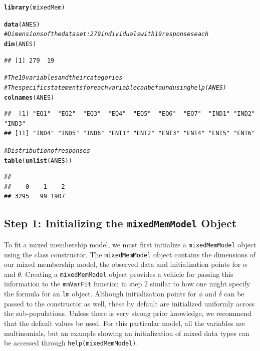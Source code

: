 \documentclass{article}\usepackage[]{graphicx}\usepackage[]{color}
\makeatletter
\newcommand{\hlcom}[1]{\textcolor[rgb]{0.678,0.584,0.686}{\textit{#1}}}%
\newcommand{\hlstd}[1]{\textcolor[rgb]{0.345,0.345,0.345}{#1}}%
\newcommand{\hlkwd}[1]{\textcolor[rgb]{0.737,0.353,0.396}{\textbf{#1}}}%
\newenvironment{kframe}{%
 \def\at@end@of@kframe{}%
 \ifinner\ifhmode%
  \def\at@end@of@kframe{\end{minipage}}%
  \begin{minipage}{\columnwidth}%
 \fi\fi%
 \def\FrameCommand##1{\hskip\@totalleftmargin \hskip-\fboxsep
 \colorbox{shadecolor}{##1}\hskip-\fboxsep
     \hskip-\linewidth \hskip-\@totalleftmargin \hskip\columnwidth}%
 \MakeFramed {\advance\hsize-\width
   \@totalleftmargin\z@ \linewidth\hsize
   \@setminipage}}%
 {\par\unskip\endMakeFramed%
 \at@end@of@kframe}
\newenvironment{knitrout}{}{} %
\renewenvironment{knitrout}{\begin{singlespace}}{\end{singlespace}}
\makeatother
\begin{document}
\begin{knitrout}
\color{fgcolor}\begin{kframe}
\begin{alltt}
\hlkwd{library}\hlstd{(mixedMem)}
\end{alltt}


{\ttfamily\noindent\itshape\color{messagecolor}{\#\# Loading required package: gtools}}\begin{alltt}
\hlkwd{data}\hlstd{(ANES)}
\hlcom{# Dimensions of the data set: 279 individuals with 19 responses each}
\hlkwd{dim}\hlstd{(ANES)}
\end{alltt}
\begin{verbatim}
## [1] 279  19
\end{verbatim}
\begin{alltt}
\hlcom{# The 19 variables and their categories}
\hlcom{#The specific statements for each variable can be found using help(ANES)}
\hlkwd{colnames}\hlstd{(ANES)}
\end{alltt}
\begin{verbatim}
##  [1] "EQ1"  "EQ2"  "EQ3"  "EQ4"  "EQ5"  "EQ6"  "EQ7"  "IND1" "IND2" "IND3"
## [11] "IND4" "IND5" "IND6" "ENT1" "ENT2" "ENT3" "ENT4" "ENT5" "ENT6"
\end{verbatim}
\begin{alltt}
\hlcom{# Distribution of responses}
\hlkwd{table}\hlstd{(}\hlkwd{unlist}\hlstd{(ANES))}
\end{alltt}
\begin{verbatim}
## 
##    0    1    2 
## 3295   99 1907
\end{verbatim}
\end{kframe}
\end{knitrout}

\subsection*{Step 1: Initializing the \texttt{mixedMemModel} Object}
To fit a mixed membership model, we must first initialize a \texttt{mixedMemModel} object using the class constructor. The \texttt{mixedMemModel} object contains the dimensions of our mixed membership model, the observed data and initialization points for $\alpha$ and $\theta$. Creating a \texttt{mixedMemModel} object provides a vehicle for passing this information to the \texttt{mmVarFit} function in step 2 similar to how one might specify the formula for an \texttt{lm} object. Although initialization points for $\phi$ and $\delta$ can be passed to the constructor as well, these by default are initialized uniformly across the sub-populations. Unless there is very strong prior knowledge, we recommend that the default values be used. For this particular model, all the variables are multinomials, but an example showing an initialization of mixed data types can be accessed through \texttt{help(mixedMemModel)}.
\end{document}
